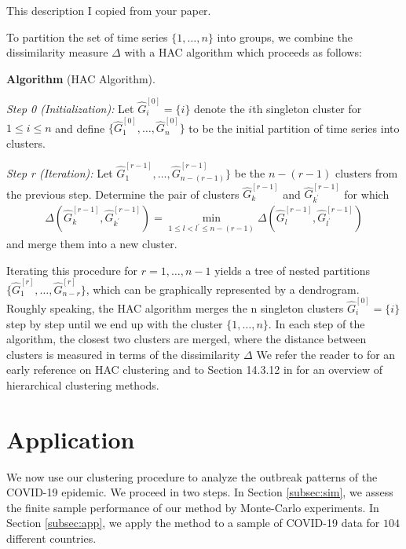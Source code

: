 \documentclass[a4paper,11pt]{article}
\numberwithin{equation}{section}
\begin{document}
{\color{red} This description I copied from your paper.

To partition the set of time series $\{1,\ldots, n\}$ into groups, we combine the dissimilarity measure $\Delta$ with a HAC algorithm which proceeds as follows:

\textbf{Algorithm} (HAC Algorithm).

\textit{Step 0 (Initialization):} Let $\hat{G}_i^{[0]} = \{i\}$ denote the $i$th singleton cluster for $1 \leq i \leq n$ and define $\{\hat{G}_1^{[0]}, \ldots, \hat{G}_n^{[0]}\}$ to be the
initial partition of time series into clusters.

\textit{Step r (Iteration):} Let $\hat{G}^{[r-1]}_1, \ldots, \hat{G}^{[r-1]}_{n - (r-1)}\}$ be the $n-(r-1)$ clusters from the previous step. Determine the pair of clusters $\hat{G}^{[r-1]}_k$ and $\hat{G}^{[r-1]}_{k^\prime}$ for which 
\begin{align*}
\Delta(\hat{G}^{[r-1]}_{k}, \hat{G}^{[r-1]}_{k^\prime}) = \min_{1 \leq l < l^\prime \leq n- (r-1)} \Delta(\hat{G}^{[r-1]}_{l}, \hat{G}^{[r-1]}_{l^\prime})
\end{align*}
and merge them into a new cluster.

Iterating this procedure for $r = 1, \ldots, n-1$ yields a tree of nested partitions \linebreak $\{\hat{G}^{[r]}_1, \ldots, \hat{G}^{[r]}_{n-r} \}$, which can be graphically
represented by a dendrogram. Roughly speaking, the HAC algorithm merges the n singleton clusters $\hat{G}^{[0]}_i = \{i\}$ step by step until we end up with the cluster $\{1, \ldots, n\}$. In each step of the algorithm, the closest two clusters are merged, where the distance between clusters is measured in terms of the dissimilarity $\Delta$ We refer the reader to \cite{Ward1963} for an early reference on HAC clustering and to Section 14.3.12 in \cite{HastieTibshiraniFriedman2009} for an overview of hierarchical clustering methods.}

\section{Application}\label{sec:app}

We now use our clustering procedure to analyze the outbreak patterns of the COVID-19 epidemic. We proceed in two steps. In Section \ref{subsec:sim}, we assess the finite sample performance of our method by Monte-Carlo experiments. In Section \ref{subsec:app}, we apply the method to a sample of COVID-19 data for $104$ different countries.
\end{document}
